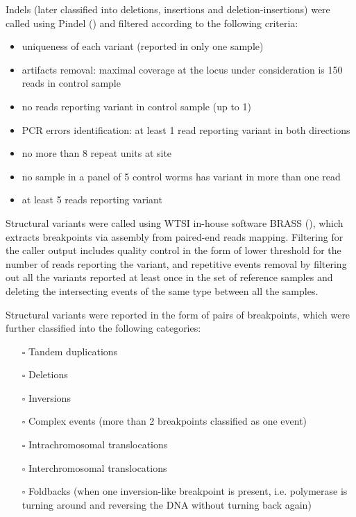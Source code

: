 Indels (later classified into deletions, insertions and deletion-insertions) were called using Pindel (\cite{pindel}) and filtered according to the following criteria:
\begin{itemize}
\itemsep0em
\item uniqueness of each variant (reported in only one sample)
\item artifacts removal: maximal coverage at the locus under consideration is 150 reads in control sample
\item no reads reporting variant in control sample (up to 1)
\item PCR errors identification: at least 1 read reporting variant in both directions
\item no more than 8 repeat units at site
\item no sample in a panel of 5 control worms has variant in more than one read
\item at least 5 reads reporting variant
\end{itemize}

Structural variants were called using WTSI in-house software BRASS (\cite{NZ}), which extracts breakpoints via assembly from paired-end reads mapping. Filtering for the caller output includes quality control in the form of lower threshold for the number of reads reporting the variant, and repetitive events removal by filtering out all the variants reported at least once in the set of reference samples and deleting the intersecting events of the same type between all the samples.

Structural variants were reported in the form of pairs of breakpoints, which were further classified into the following categories:
\begin{itemize}
\itemsep0em
\item[$\square$] Tandem duplications
\item[$\square$] Deletions
\item[$\square$] Inversions
\item[$\square$] Complex events (more than 2 breakpoints classified as one event)
\item[$\square$] Intrachromosomal translocations
\item[$\square$] Interchromosomal translocations
\item[$\square$] Foldbacks (when one inversion-like breakpoint is present, i.e. polymerase is turning around and reversing the DNA without turning back again)
\end{itemize}

